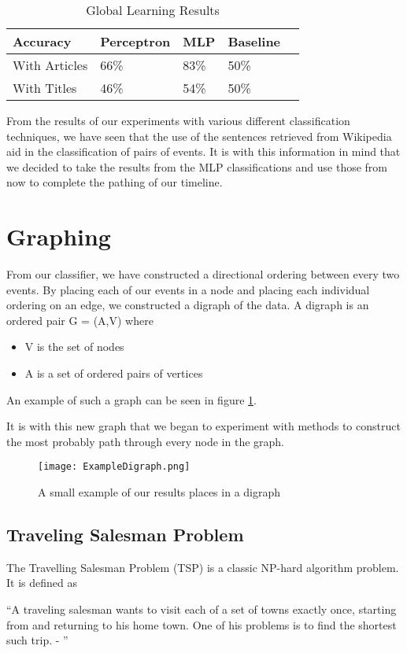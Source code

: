 \documentclass[bsc,frontabs,twoside,singlespacing,parskip,deptreport]{infthesis}     %
\begin{document}
\begin{table}[H]
\centering
\label{table:global-learning}
\begin{tabular}{|p{5em}|l|l|p{4em}|l|}
  \hline
  {\small Accuracy}  & {\small Perceptron} & {\small MLP} & Baseline\\
  \hline
{\small With Articles}    & 66\%  & 83\% & 50\%\\
\hline
{\small With Titles} & 46\%  & 54\% & 50\%\\
\hline
\end{tabular}
\caption{Global Learning Results}
\end{table}

From the results of our experiments with various different classification techniques, we have seen that the use of the sentences retrieved
from Wikipedia aid in the classification of pairs of events. It is with this information in mind that we decided to take the results from
the MLP classifications and use those from now to complete the pathing of our timeline.

\section{Graphing} \label{chapter:graphing}
From our classifier, we have constructed a directional ordering between every two events.
By placing each of our events in a node and placing each individual ordering on an edge, we constructed
a digraph of the data.
A digraph is an ordered pair G = (A,V) where\cite{bang2008digraphs}
\begin{itemize}
  \item V is the set of nodes
  \item A is a set of ordered pairs of vertices
\end{itemize}
An example of such a graph can be seen in figure \ref{fig:digraph}.

It is with this new graph that we began to experiment with methods to construct the most probably path through every
node in the graph.


\begin{figure}
  \centering
  \texttt{[image: ExampleDigraph.png]}
  \caption{A small example of our results places in a digraph}
  \label{fig:digraph}
 \end{figure}

\subsection{Traveling Salesman Problem}
The Travelling Salesman Problem (TSP) is a classic NP-hard algorithm problem\cite{junger1995traveling}.%
It is defined as
\begin{center}
\enquote{A traveling salesman wants to visit each of a set of towns exactly once, starting
from and returning to his home town. One of his problems is to find the shortest
such trip. - \cite{junger1995traveling}}
\end{center}
\end{document}
